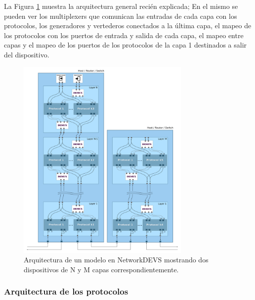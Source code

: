 \documentclass[10pt,a4paper]{article}
\begin{document}
La Figura \ref{figure:general architecture} muestra la arquitectura general recién explicada; En el mismo se pueden ver los multiplexers que comunican las entradas de cada capa con los protocolos, los generadores y vertederos conectados a la última capa, el mapeo de los protocolos con los puertos de entrada y salida de cada capa, el mapeo entre capas y el mapeo de los puertos de los protocolos de la capa 1 destinados a salir del dispositivo. \\

\begin{figure}[!bht]
    \centering
    \includegraphics[width = 0.75\textwidth]{img/png/general_architecture.png}
    \caption{Arquitectura de un modelo en NetworkDEVS mostrando dos dispositivos de N y M capas correspondientemente.}
    \label{figure:general architecture}
\end{figure}

\newpage

\subsubsection{Arquitectura de los protocolos}
\end{document}
